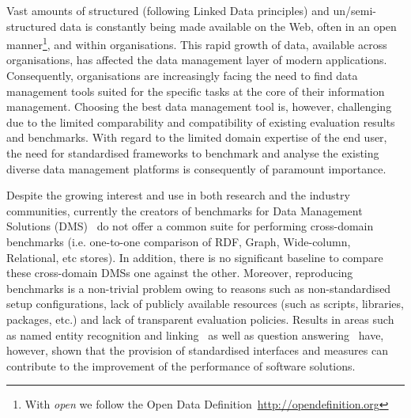 \documentclass{llncs}
\begin{document}
Vast amounts of structured (following Linked Data principles) and un/semi-structured data is constantly being made available on the Web, often in an open manner\footnote{With \emph{open} we follow the Open Data Definition~\url{http://opendefinition.org}}, and within organisations.
This rapid growth of data, available across organisations, has affected the data management layer of modern applications. 
Consequently,
organisations are increasingly facing the need to find data management tools suited for the specific tasks at the core of their information management. 
Choosing the best data management tool is, however, challenging due to the limited comparability and compatibility of existing evaluation results and benchmarks. 
With regard to the limited domain expertise of the end user, 
the need for standardised frameworks to benchmark and analyse the existing diverse data management platforms is consequently of paramount importance.

Despite the growing interest and use in both research and the industry communities, currently 
the creators of benchmarks for Data Management Solutions (DMS)~\cite{alucc2014diversified,Bizer2009TheBS} do not offer a common 
suite for performing cross-domain benchmarks (i.e. one-to-one comparison of RDF, Graph, Wide-column, Relational, etc stores). In addition, there is no significant baseline to compare these cross-domain DMSs one against the other. 
Moreover, reproducing benchmarks is a non-trivial problem owing to reasons such as non-standardised setup configurations, lack of publicly available resources (such as scripts, libraries, packages, etc.) and lack of transparent evaluation policies. Results in areas such as named entity recognition and linking~\cite{gerbil} as well as question answering~\cite{bioasq,qald} have, however, shown that the provision of standardised interfaces and measures can contribute to the improvement of the performance of software solutions. 
    
\end{document}
